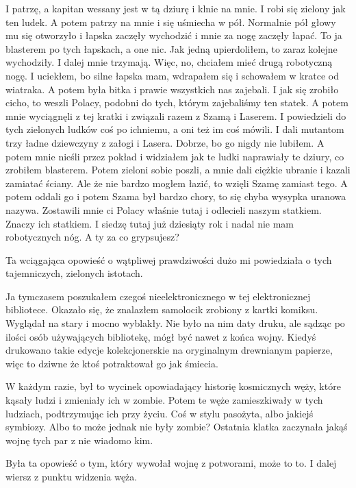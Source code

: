 \begin{poem}
	I patrzę, a kapitan wessany jest w tą dziurę i klnie na mnie. I robi się zielony jak ten ludek.
	A potem patrzy na mnie i się uśmiecha w pół. Normalnie pół głowy mu się otworzyło i łapska zaczęły wychodzić i mnie za nogę zaczęły łapać. 
	To ja blasterem po tych łapskach, a one nic. Jak jedną upierdoliłem, to zaraz kolejne wychodziły. I dalej mnie trzymają.
	Więc, no, chciałem mieć drugą robotyczną nogę.
	I uciekłem, bo silne łapska mam, wdrapałem się i schowałem w kratce od wiatraka.
	A potem była bitka i prawie wszystkich nas zajebali.
	I jak się zrobiło cicho, to weszli Polacy, podobni do tych, którym zajebaliśmy ten statek.
	A potem mnie wyciągnęli z tej kratki i związali razem z Szamą i Laserem.
	I powiedzieli do tych zielonych ludków coś po ichniemu, a oni też im coś mówili. I dali mutantom trzy ładne dziewczyny z załogi i Lasera.
	Dobrze, bo go nigdy nie lubiłem.
	A potem mnie nieśli przez pokład i widziałem jak te ludki naprawiały te dziury, co zrobiłem blasterem.
	Potem zieloni sobie poszli, a mnie dali ciężkie ubranie i kazali zamiatać ściany. Ale że nie bardzo mogłem łazić, to wzięli Szamę zamiast tego.
	A potem oddali go i potem Szama był bardzo chory, to się chyba wysypka uranowa nazywa.
	Zostawili mnie ci Polacy właśnie tutaj i odlecieli naszym statkiem. Znaczy ich statkiem.
	I siedzę tutaj już dziesiąty rok i nadal nie mam robotycznych nóg. A ty za co grypsujesz?
\end{poem}

Ta wciągająca opowieść o wątpliwej prawdziwości dużo mi powiedziała o tych tajemniczych, zielonych istotach.

Ja tymczasem poszukałem czegoś nieelektronicznego w tej elektronicznej bibliotece.
Okazało się, że znalazłem samolocik zrobiony z kartki komiksu.
Wyglądał na stary i mocno wyblakły. Nie było na nim daty druku, ale sądząc po ilości osób używających bibliotekę, mógł być nawet z końca wojny.
Kiedyś drukowano takie edycje kolekcjonerskie na oryginalnym drewnianym papierze, więc to dziwne że ktoś potraktował go jak śmiecia.

W każdym razie, był to wycinek opowiadający historię kosmicznych węży, które kąsały ludzi i zmieniały ich w zombie.
Potem te węże zamieszkiwały w tych ludziach, podtrzymując ich przy życiu. Coś w stylu pasożyta, albo jakiejś symbiozy.
Albo to może jednak nie były zombie? 
Ostatnia klatka zaczynała jakąś wojnę tych par z nie wiadomo kim.

Była ta opowieść o tym, który wywołał wojnę z potworami, może to to.
I dalej wiersz z punktu widzenia węża.

